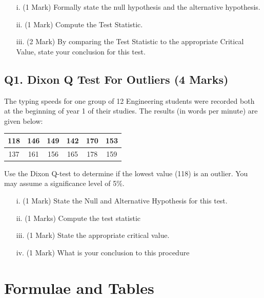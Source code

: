 \documentclass[a4paper,12pt]{article}
\begin{document}
\begin{itemize}
	\item[i.] (1 Mark) Formally state the null hypothesis and the alternative hypothesis.
	\item[ii.] (1 Mark) Compute the Test Statistic.
	\item[iii.] (2 Mark) By comparing the Test Statistic to the appropriate Critical Value, state your conclusion for this test.
\end{itemize}


\bigskip
\subsection*{Q1. Dixon Q Test For Outliers (4 Marks)}

The typing speeds for one group of 12 Engineering students were recorded both at the beginning of year 1 of their studies. The results (in words per minute) are given below:

\begin{center}
	\begin{tabular}{|c|c|c|c|c|c|}
		\hline
		118 & 146 & 149 & 142 & 170& 153\\ \hline
		137 & 161 & 156& 165&  178& 159
		\\ \hline
	\end{tabular}
\end{center}
Use the Dixon Q-test to determine if the lowest value (118) is an outlier. You may assume a significance level of 5\%.
\begin{itemize}
	\item[i.](1 Mark)	State the Null and Alternative Hypothesis for this test.
	\item[ii.](1 Marks) Compute the test statistic
	\item[iii.](1 Mark) State the appropriate critical value.
	\item[iv.](1 Mark) What is your conclusion to this procedure
\end{itemize}


\newpage


\section*{Formulae and Tables}
\end{document}
